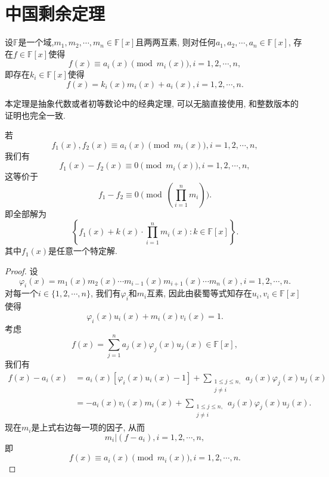 \documentclass[../../main.tex]{subfiles}
\begin{document}
\section{中国剩余定理}

\begin{theorem}[中国剩余定理]\label{theorem:中国剩余定理(多项式版)}
设$\mathbb{F}$是一个域,$m_1,m_2,\cdots,m_n\in\mathbb{F}[x]$且两两互素, 则对任何$a_1,a_2,\cdots,a_n\in\mathbb{F}[x]$, 存在$f\in\mathbb{F}[x]$使得
$$
f(x)\equiv a_i(x)\pmod{m_i(x)},i=1,2,\cdots,n,
$$
即存在$k_i\in\mathbb{F}[x]$使得
$$
f(x)=k_i(x)m_i(x)+a_i(x),i=1,2,\cdots,n.
$$
\end{theorem}
\begin{note}
本定理是抽象代数或者初等数论中的经典定理, 可以无脑直接使用, 和整数版本的证明也完全一致.
\end{note}
\begin{remark}
若
$$
f_1(x),f_2(x)\equiv a_i(x)\pmod{m_i(x)},i=1,2,\cdots,n,
$$
我们有
$$
f_1(x)-f_2(x)\equiv0\pmod{m_i(x)},i=1,2,\cdots,n,
$$
这等价于
$$
f_1-f_2\equiv0\pmod{\left(\prod_{i=1}^{n}m_i\right)}.
$$
即全部解为
$$
\left\{f_1(x)+k(x)\cdot\prod_{i=1}^{n}m_i(x):k\in\mathbb{F}[x]\right\}.
$$
其中$f_1(x)$是任意一个特定解.
\end{remark}
\begin{proof}
设
$$
\varphi_i(x)=m_1(x)m_2(x)\cdots m_{i-1}(x)m_{i+1}(x)\cdots m_n(x),i=1,2,\cdots,n.
$$
对每一个$i\in\{1,2,\cdots,n\}$, 我们有$\varphi_i$和$m_i$互素, 因此由裴蜀等式知存在$u_i,v_i\in\mathbb{F}[x]$使得
$$
\varphi_i(x)u_i(x)+m_i(x)v_i(x)=1.
$$
考虑
$$
f(x)=\sum_{j=1}^{n}a_j(x)\varphi_j(x)u_j(x)\in\mathbb{F}[x],
$$
我们有
$$
\begin{aligned}
f(x)-a_i(x)&=a_i(x)\left[\varphi_i(x)u_i(x)-1\right]+\sum_{\substack{1\leqslant j\leqslant n,\\j\neq i}}a_j(x)\varphi_j(x)u_j(x)\\
&=-a_i(x)v_i(x)m_i(x)+\sum_{\substack{1\leqslant j\leqslant n,\\j\neq i}}a_j(x)\varphi_j(x)u_j(x).
\end{aligned}
$$
现在$m_i$是上式右边每一项的因子, 从而
$$
m_i|(f-a_i),i=1,2,\cdots,n,
$$
即
$$
f(x)\equiv a_i(x)\pmod{m_i(x)},i=1,2,\cdots,n.
$$

\end{proof}
\end{document}
